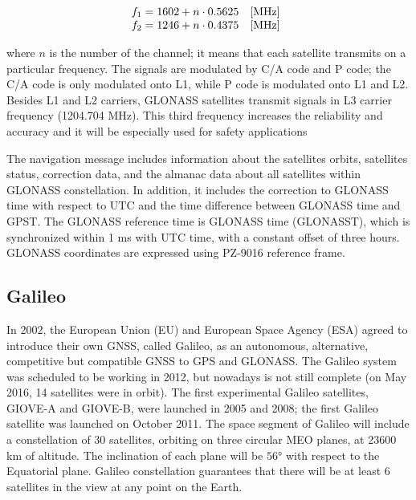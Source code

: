 \begin{equation} 
	\begin{matrix} 
		f_{1} = 1602 + n \cdot 0.5625 & [\unit{MHz}]\\ f_{2} = 1246 + n \cdot 0.4375 &[\unit{MHz}] \end{matrix} 
	\\
	\label{eq:f12GLONASS}
\end{equation}

where $n$ is the number of the channel; it means that each satellite transmits on a particular frequency. The signals are modulated by C/A code and P code; the C/A code is only modulated onto L1, while P code is modulated onto L1 and L2. Besides L1 and L2 carriers, GLONASS satellites transmit signals in L3 carrier frequency (1204.704 MHz). This third frequency increases the reliability and accuracy and it will be especially used for safety applications

The navigation message includes information about the satellites orbits, satellites status, correction data, and the almanac data about all satellites within GLONASS constellation. In addition, it includes the
correction to GLONASS time with respect to UTC and the time difference between GLONASS time and GPST. The GLONASS reference time is GLONASS time (GLONASST), which is synchronized within 1 ms with UTC time, with a constant offset of three hours. GLONASS coordinates are expressed using PZ-9016 reference frame.

\subsection{Galileo}

In 2002, the European Union (EU) and European Space Agency (ESA) agreed to introduce their own GNSS, called Galileo, as an autonomous, alternative, competitive but compatible GNSS to GPS and GLONASS. The Galileo system was scheduled to be working in 2012, but nowadays is not still complete (on May 2016, 14 satellites were in orbit). The first experimental Galileo satellites, GIOVE-A and GIOVE-B, were launched in 2005 and 2008; the first Galileo satellite was launched on October 2011. The space segment of Galileo will include a constellation of 30 satellites, orbiting on three circular MEO planes, at 23600 km of altitude. The inclination of each plane will be $\ang{56}$ with respect to the Equatorial plane. Galileo constellation guarantees that there will be at least 6 satellites in the view at any point on the Earth.

